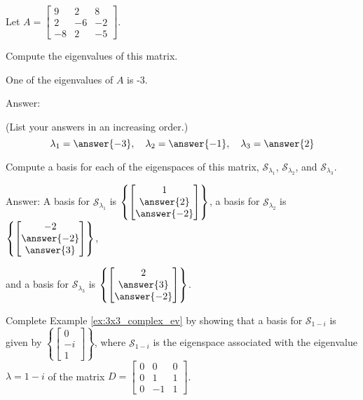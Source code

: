 \documentclass{ximera}
\begin{document}
\begin{problem}
Let $A=\begin{bmatrix} 9 & 2 & 8\\ 2 & -6 & -2\\ -8 & 2 & -5\end{bmatrix}$.  
\begin{problem}\label{prob:3x3fromKuttler1}
Compute the eigenvalues of this matrix. 
\begin{hint}
One of the eigenvalues of $A$ is -3.
\end{hint}

Answer:

(List your answers in an increasing order.)
$$\lambda_1 = \answer{-3},\quad \lambda_2 = \answer{-1},\quad \lambda_3 = \answer{2}$$
\end{problem}

\begin{problem}\label{prob:3x3fromKuttler2}
Compute a basis for each of the eigenspaces of this matrix,  $\mathcal{S}_{\lambda_1}$, $\mathcal{S}_{\lambda_2}$, and $\mathcal{S}_{\lambda_3}$.

Answer:
A basis for $\mathcal{S}_{\lambda_1}$ is $\left\{\begin{bmatrix}1\\\answer{2}\\\answer{-2}\end{bmatrix}\right\}$, 
a basis for $\mathcal{S}_{\lambda_2}$ is $\left\{\begin{bmatrix}-2\\\answer{-2}\\\answer{3}\end{bmatrix}\right\}$,

and a basis for $\mathcal{S}_{\lambda_3}$ is $\left\{\begin{bmatrix}2\\\answer{3}\\\answer{-2}\end{bmatrix}\right\}$.
\end{problem}
\end{problem}

\begin{problem}\label{prob:3x3_complex_ev}
Complete Example \ref{ex:3x3_complex_ev} by showing that a basis for $\mathcal{S}_{1-i}$ is given by $\left\{\begin{bmatrix}0\\-i\\1\end{bmatrix}\right\}$, where  $\mathcal{S}_{1-i}$ is the eigenspace associated with the eigenvalue $\lambda=1-i$ of the matrix $D=\begin{bmatrix} 0&0&0\\ 0 &1&1\\ 0 & -1&1\end{bmatrix}$.
\end{problem}
\end{document}
